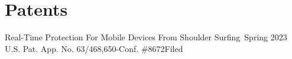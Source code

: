 \section{Patents}
  \CVSubHeadingListStart
    \CVSubheading
      {Real-Time Protection For Mobile Devices From Shoulder Surfing~\cite{ShoulderSurfing}}{Spring 2023}
      {U.S. Pat. App. No. 63/468,650-Conf. \#8672}{Filed}
  \CVSubHeadingListEnd